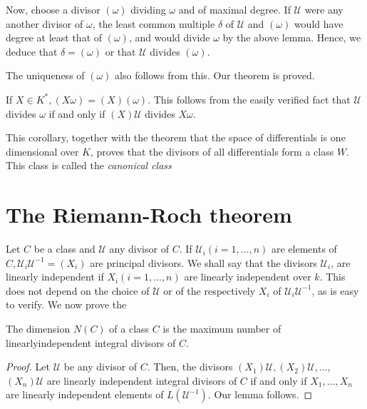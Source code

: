 Now, choose a divisor $(\omega)$ dividing $\omega$ and of maximal
degree. If $\mathscr{U}$ were any another divisor of $\omega$, the
least common multiple $\delta$ of $\mathscr{U}$ and $(\omega)$ would
have degree at least that of $(\omega)$, and would divide $\omega$ by
the above lemma. Hence, we deduce that  $\delta = (\omega)$ or that
$\mathscr{U}$ divides $(\omega)$. 

The uniqueness of $(\omega)$ also follows from this. Our theorem is proved.

\setcounter{corollary}{0}
\begin{corollary}\label{chap8:sec14:coro1}%
  If $X \in K^*, (X \omega) = (X) (\omega)$. This follows from the
  easily verified fact that $\mathscr{U}$ divides $\omega$ if and only
  if $(X) \mathscr{U}$ divides $X \omega$. 
\end{corollary}

This corollary, together with the theorem that the space of
differentials is one dimensional over $K$, proves that the divisors of
all differentials form a class $W$. This class is called the
\textit{canonical class} 

\section{The Riemann-Roch theorem}\label{chap8:sec15}%

Let $C$ be a class and $\mathscr{U}$ any divisor of $C$. If
$\mathscr{U}_i (i=1, \ldots , n)$ are elements of $C, \mathscr{U}_i
\mathscr{U}^{-1} = (X_i)$ are principal divisors. We shall say that
the divisors $\mathscr{U}_i$, are linearly independent if $X_i(i=1,
\ldots , n)$ are linearly independent over $k$. This does not depend
on the choice of $\mathscr{U}$ or of the respectively $X_i$ of
$\mathscr{U}_i \mathscr{U}^{-1}$, as is easy to verify. We now prove
the  
\begin{lemma*}
  The dimension $N(C)$ of a class $C$ is the maximum number of
  linearly\pageoriginale independent integral divisors of $C$. 
\end{lemma*}

\begin{proof}
  Let $\mathscr{U}$ be any divisor of $C$. Then, the divisors $(X_1)
  \mathscr{U}, (X_2) \mathscr{U}, \ldots$, $(X_n) \mathscr{U}$ are
  linearly independent integral divisors of $C$ if and only if $X_1,
  \ldots ,X_n$ are linearly independent elements of $L
  (\mathscr{U}^{-1})$. Our lemma follows. 
\end{proof}

